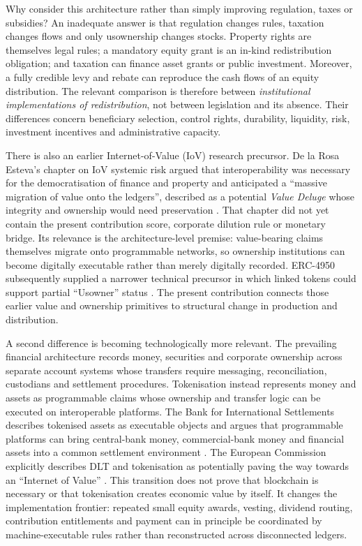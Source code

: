 Why consider this architecture rather than simply improving regulation, taxes or subsidies? An inadequate answer is that regulation changes rules, taxation changes flows and only usownership changes stocks. Property rights are themselves legal rules; a mandatory equity grant is an in-kind redistribution obligation; and taxation can finance asset grants or public investment. Moreover, a fully credible levy and rebate can reproduce the cash flows of an equity distribution. The relevant comparison is therefore between \emph{institutional implementations of redistribution}, not between legislation and its absence. Their differences concern beneficiary selection, control rights, durability, liquidity, risk, investment incentives and administrative capacity.

There is also an earlier Internet-of-Value (IoV) research precursor. De la Rosa Esteva's chapter on IoV systemic risk argued that interoperability was necessary for the democratisation of finance and property and anticipated a ``massive migration of value onto the ledgers'', described as a potential \emph{Value Deluge} whose integrity and ownership would need preservation \citep{delarosa2022iov}. That chapter did not yet contain the present contribution score, corporate dilution rule or monetary bridge. Its relevance is the architecture-level premise: value-bearing claims themselves migrate onto programmable networks, so ownership institutions can become digitally executable rather than merely digitally recorded. ERC-4950 subsequently supplied a narrower technical precursor in which linked tokens could support partial ``Usowner'' status \citep{erc4950}. The present contribution connects those earlier value and ownership primitives to structural change in production and distribution.

A second difference is becoming technologically more relevant. The prevailing financial architecture records money, securities and corporate ownership across separate account systems whose transfers require messaging, reconciliation, custodians and settlement procedures. Tokenisation instead represents money and assets as programmable claims whose ownership and transfer logic can be executed on interoperable platforms. The Bank for International Settlements describes tokenised assets as executable objects and argues that programmable platforms can bring central-bank money, commercial-bank money and financial assets into a common settlement environment \citep{bis2022,bis2023,bis2025}. The European Commission explicitly describes DLT and tokenisation as potentially paving the way towards an ``Internet of Value'' \citep{eciov2026}. This transition does not prove that blockchain is necessary or that tokenisation creates economic value by itself. It changes the implementation frontier: repeated small equity awards, vesting, dividend routing, contribution entitlements and payment can in principle be coordinated by machine-executable rules rather than reconstructed across disconnected ledgers.

